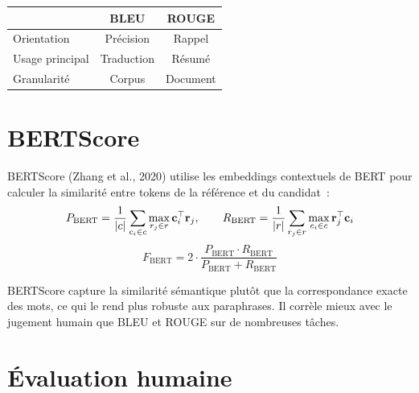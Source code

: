 \begin{proposition}
\begin{center}
\renewcommand{\arraystretch}{1.3}
\begin{tabular}{lcc}
    \toprule
    & \textbf{BLEU} & \textbf{ROUGE} \\
    \midrule
    Orientation & Pr\'ecision & Rappel \\
    Usage principal & Traduction & R\'esum\'e \\
    Granularit\'e & Corpus & Document \\
    \bottomrule
\end{tabular}
\end{center}
\end{proposition}

\section{BERTScore}
\label{sec:eval:bertscore}

\begin{definition}[BERTScore]
BERTScore (Zhang et al., 2020) utilise les embeddings contextuels de
BERT pour calculer la similarit\'e entre tokens de la r\'ef\'erence et
du candidat~:
\[
    P_{\text{BERT}} = \frac{1}{\left| c \right|} \sum_{c_i \in c}
    \max_{r_j \in r} \mathbf{c}_i^\top \mathbf{r}_j,
    \qquad
    R_{\text{BERT}} = \frac{1}{\left| r \right|} \sum_{r_j \in r}
    \max_{c_i \in c} \mathbf{r}_j^\top \mathbf{c}_i
\]
\[
    F_{\text{BERT}} = 2 \cdot \frac{P_{\text{BERT}} \cdot R_{\text{BERT}}}
    {P_{\text{BERT}} + R_{\text{BERT}}}
\]
\end{definition}

\begin{remarque}
BERTScore capture la similarit\'e s\'emantique plut\^ot que la
correspondance exacte des mots, ce qui le rend plus robuste aux
paraphrases. Il corr\`ele mieux avec le jugement humain que BLEU
et ROUGE sur de nombreuses t\^aches.
\end{remarque}

\section{\'Evaluation humaine}
\label{sec:eval:humaine}

